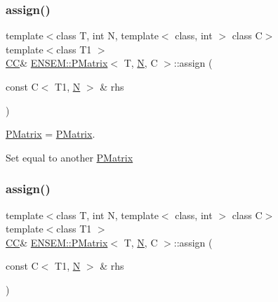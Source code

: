 \subsubsection{\texorpdfstring{assign()}{assign()}\hspace{0.1cm}{\footnotesize\ttfamily [7/9]}}
{\footnotesize\ttfamily template$<$class T, int N, template$<$ class, int $>$ class C$>$ \\
template$<$class T1 $>$ \\
\mbox{\hyperlink{classENSEM_1_1PMatrix_a744bac549029029effe32dc1705660ec}{CC}}\& \mbox{\hyperlink{classENSEM_1_1PMatrix}{E\+N\+S\+E\+M\+::\+P\+Matrix}}$<$ T, \mbox{\hyperlink{adat__devel_2lib_2hadron_2operator__name__util_8cc_a7722c8ecbb62d99aee7ce68b1752f337}{N}}, C $>$\+::assign (\begin{DoxyParamCaption}\item[{const C$<$ T1, \mbox{\hyperlink{adat__devel_2lib_2hadron_2operator__name__util_8cc_a7722c8ecbb62d99aee7ce68b1752f337}{N}} $>$ \&}]{rhs }\end{DoxyParamCaption})\hspace{0.3cm}{\ttfamily [inline]}}



\mbox{\hyperlink{classENSEM_1_1PMatrix}{P\+Matrix}} = \mbox{\hyperlink{classENSEM_1_1PMatrix}{P\+Matrix}}. 

Set equal to another \mbox{\hyperlink{classENSEM_1_1PMatrix}{P\+Matrix}} \mbox{\label{classENSEM_1_1PMatrix_ac3c0e489c8c8011edc4ea93477176b84}} 
\subsubsection{\texorpdfstring{assign()}{assign()}\hspace{0.1cm}{\footnotesize\ttfamily [8/9]}}
{\footnotesize\ttfamily template$<$class T, int N, template$<$ class, int $>$ class C$>$ \\
template$<$class T1 $>$ \\
\mbox{\hyperlink{classENSEM_1_1PMatrix_a744bac549029029effe32dc1705660ec}{CC}}\& \mbox{\hyperlink{classENSEM_1_1PMatrix}{E\+N\+S\+E\+M\+::\+P\+Matrix}}$<$ T, \mbox{\hyperlink{adat__devel_2lib_2hadron_2operator__name__util_8cc_a7722c8ecbb62d99aee7ce68b1752f337}{N}}, C $>$\+::assign (\begin{DoxyParamCaption}\item[{const C$<$ T1, \mbox{\hyperlink{adat__devel_2lib_2hadron_2operator__name__util_8cc_a7722c8ecbb62d99aee7ce68b1752f337}{N}} $>$ \&}]{rhs }\end{DoxyParamCaption})\hspace{0.3cm}{\ttfamily [inline]}}



